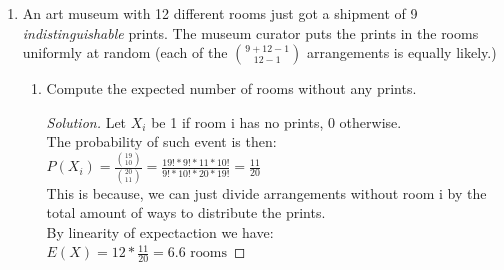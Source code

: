 \documentclass[10pt,letterpaper,unboxed,cm]{article}
\newenvironment{solution}
  {\begin{proof}[Solution]}
  {\end{proof}}
\begin{document}
\begin{enumerate}
\begin{enumerate}
\begin{enumerate}
\item
Compute the expected number of rooms with exactly 1 painting.

\begin{solution}
    
    Let $X_i$ be 1 if room has exactly one painting, 0 otherwise.\\
    \(P(X_i) = \frac{1}{12}*(\frac{11}{12})^8\)\\
    This is true because probability that the first painting gets into room i is $\frac{1}{12}$, and the probability that the 8 remaining paintings don't end up in room i is: $(\frac{11}{12})^8$.\\
    Now by linearity the expected number of rooms with exactly one painting comes to be:\\
    \(E(X) = 12*9*\frac{1}{12}*(\frac{11}{12})^8 \approx \boxed{4.49\text{ rooms}}\)\\
    Because we have 12 rooms and 9 paintings.

\end{solution}

\end{enumerate}


\item
An art museum with 12 different rooms just got a shipment of 9 \emph{indistinguishable} prints. The museum curator puts the prints in the rooms uniformly at random (each of the ${9 + 12-1 \choose 12-1}$ arrangements is equally likely.)

\begin{enumerate}
\item
Compute the expected number of rooms without any prints.

\begin{solution}
    
    Let $X_i$ be 1 if room i has no prints, 0 otherwise.\\
    The probability of such event is then:\\
    \(P(X_i) = \frac{\binom{19}{10}}{\binom{20}{11}} = \frac{19!*9!*11*10!}{9!*10!*20*19!} = \frac{11}{20}\)\\
    This is because, we can just divide arrangements without room i by the total amount of ways to distribute the prints.\\
    By linearity of expectaction we have:\\
    \(E(X) = 12 * \frac{11}{20} = \boxed{6.6 \text{ rooms}}\)

\end{solution}


\end{enumerate}
\end{enumerate}
\end{enumerate}
\end{document}

